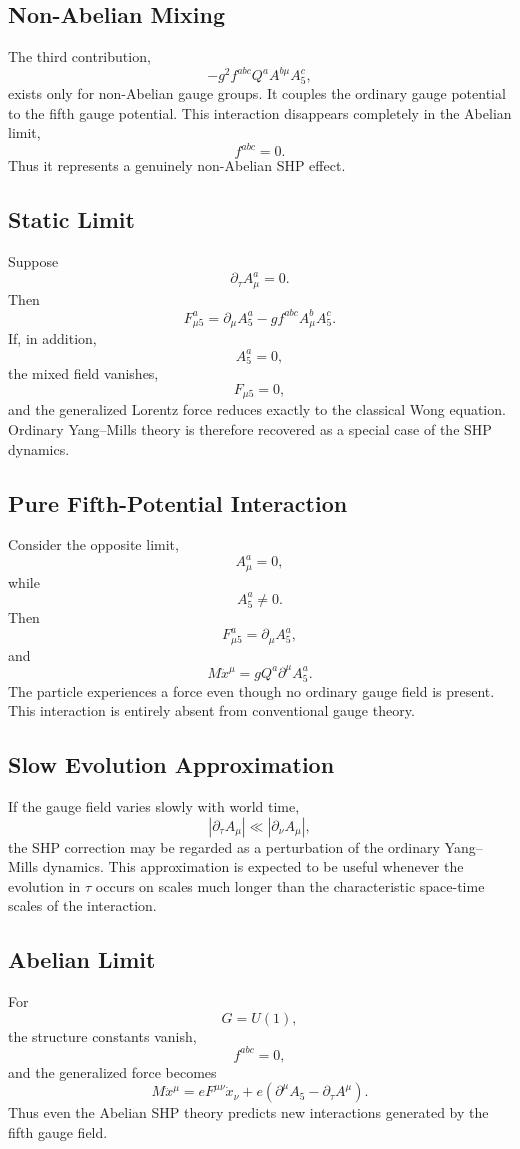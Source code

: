 \subsection{Non-Abelian Mixing}
The third contribution,
\[-g^2f^{abc}Q^aA^{b\mu}A_5^c,\]
exists only for non-Abelian gauge groups.
It couples the ordinary gauge potential to the fifth gauge potential.
This interaction disappears completely in the Abelian limit,
\[f^{abc}=0.\]
Thus it represents a genuinely non-Abelian SHP effect.
\subsection{Static Limit}
Suppose
\[\partial_\tau A_\mu^a=0.\]
Then
\[F_{\mu5}^a=\partial_\mu A_5^a-gf^{abc}A_\mu^bA_5^c.\]
If, in addition,
\[A_5^a=0,\]
the mixed field vanishes,
\[F_{\mu5}=0,\]
and the generalized Lorentz force reduces exactly to the classical Wong
equation.
Ordinary Yang--Mills theory is therefore recovered as a special case of
the SHP dynamics.
\subsection{Pure Fifth-Potential Interaction}
Consider the opposite limit,
\[A_\mu^a=0,\]
while
\[A_5^a\neq0.\]
Then
\[F_{\mu5}^a=\partial_\mu A_5^a,\]
and
\[M\ddot x^\mu=gQ^a\partial^\mu A_5^a.\]
The particle experiences a force even though no ordinary gauge field is
present.
This interaction is entirely absent from conventional gauge theory.
\subsection{Slow Evolution Approximation}
If the gauge field varies slowly with world time,
\[\left|\partial_\tau A_\mu\right|\ll\left|\partial_\nu A_\mu\right|,\]
the SHP correction may be regarded as a perturbation of the ordinary
Yang--Mills dynamics.
This approximation is expected to be useful whenever the evolution in
\(\tau\) occurs on scales much longer than the characteristic
space-time scales of the interaction.
\subsection{Abelian Limit}
For
\[G=U(1),\]
the structure constants vanish,
\[f^{abc}=0,\]
and the generalized force becomes
\[M\ddot x^\mu=eF^{\mu\nu}\dot x_\nu+e\left(\partial^\mu A_5
-\partial_\tau A^\mu\right).\]
Thus even the Abelian SHP theory predicts new interactions generated by
the fifth gauge field.
